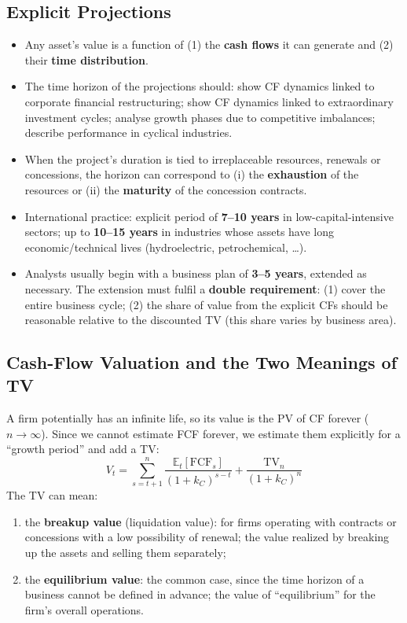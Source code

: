 \subsection{Explicit Projections}
\begin{itemize}
  \item Any asset's value is a function of (1) the \textbf{cash flows} it can generate and (2) their \textbf{time distribution}.
  \item The time horizon of the projections should: show CF dynamics linked to corporate financial restructuring; show CF dynamics linked to extraordinary investment cycles; analyse growth phases due to competitive imbalances; describe performance in cyclical industries.
  \item When the project's duration is tied to irreplaceable resources, renewals or concessions, the horizon can correspond to (i) the \textbf{exhaustion} of the resources or (ii) the \textbf{maturity} of the concession contracts.
  \item International practice: explicit period of \textbf{7--10 years} in low-capital-intensive sectors; up to \textbf{10--15 years} in industries whose assets have long economic/technical lives (hydroelectric, petrochemical, \dots).
  \item Analysts usually begin with a business plan of \textbf{3--5 years}, extended as necessary. The extension must fulfil a \textbf{double requirement}: (1) cover the entire business cycle; (2) the share of value from the explicit CFs should be reasonable relative to the discounted TV (this share varies by business area).
\end{itemize}

\subsection{Cash-Flow Valuation and the Two Meanings of TV}
A firm potentially has an infinite life, so its value is the PV of CF forever ($n\to\infty$). Since we cannot estimate FCF forever, we estimate them explicitly for a ``growth period'' and add a TV:
\[
V_t=\sum_{s=t+1}^{n}\frac{\mathbb{E}_t[\text{FCF}_s]}{(1+k_C)^{s-t}}+\frac{\text{TV}_n}{(1+k_C)^n}
\]
The TV can mean:
\begin{enumerate}
  \item the \textbf{breakup value} (liquidation value): for firms operating with contracts or concessions with a low possibility of renewal; the value realized by breaking up the assets and selling them separately;
  \item the \textbf{equilibrium value}: the common case, since the time horizon of a business cannot be defined in advance; the value of ``equilibrium'' for the firm's overall operations.
\end{enumerate}


